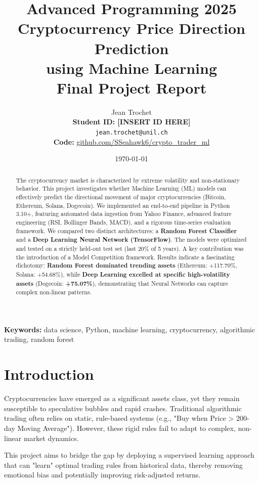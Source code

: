 \documentclass[11pt,a4paper]{article}
\title{
    \Large \textbf{Advanced Programming 2025} \\
    \vspace{0.5cm}
    \LARGE \textbf{Cryptocurrency Price Direction Prediction \\ using Machine Learning} \\
    \vspace{0.3cm}
    \large Final Project Report
}
\author{
    Jean Trochet \\
    \textbf{Student ID: [INSERT ID HERE]} \\
    \texttt{jean.trochet@unil.ch} \\
    \vspace{0.1cm}
    \small \textbf{Code:} \href{https://github.com/SSeahawk6/crypto_trader_ml}{github.com/SSeahawk6/crypto\_trader\_ml}
}
\date{\today}
\begin{document}
\maketitle
\thispagestyle{empty}

\begin{abstract}
\noindent
The cryptocurrency market is characterized by extreme volatility and non-stationary behavior. This project investigates whether Machine Learning (ML) models can effectively predict the directional movement of major cryptocurrencies (Bitcoin, Ethereum, Solana, Dogecoin). We implemented an end-to-end pipeline in Python 3.10+, featuring automated data ingestion from Yahoo Finance, advanced feature engineering (RSI, Bollinger Bands, MACD), and a rigorous time-series evaluation framework. We compared two distinct architectures: a \textbf{Random Forest Classifier} and a \textbf{Deep Learning Neural Network (TensorFlow)}. The models were optimized and tested on a strictly held-out test set (last 20\% of 5 years). A key contribution was the introduction of a Model Competition framework. Results indicate a fascinating dichotomy: \textbf{Random Forest dominated trending assets} (Ethereum: +117.70\%, Solana: +54.68\%), while \textbf{Deep Learning excelled at specific high-volatility assets} (Dogecoin: \textbf{+75.07\%}), demonstrating that Neural Networks can capture complex non-linear patterns.
\end{abstract}

\vspace{0.5cm}
\noindent\textbf{Keywords:} data science, Python, machine learning, cryptocurrency, algorithmic trading, random forest

\newpage
\tableofcontents
\newpage


\section{Introduction}
\label{sec:introduction}

Cryptocurrencies have emerged as a significant assets class, yet they remain susceptible to speculative bubbles and rapid crashes. Traditional algorithmic trading often relies on static, rule-based systems (e.g., "Buy when Price > 200-day Moving Average"). However, these rigid rules fail to adapt to complex, non-linear market dynamics.

This project aims to bridge the gap by deploying a supervised learning approach that can "learn" optimal trading rules from historical data, thereby removing emotional bias and potentially improving risk-adjusted returns.
\end{document}
